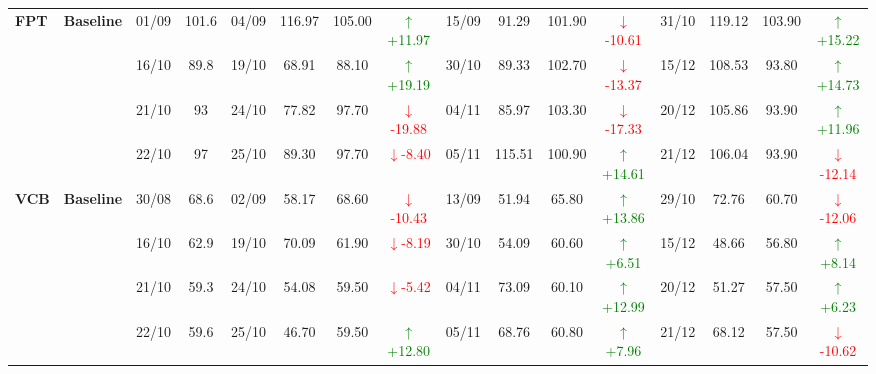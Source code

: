 {\begin{longtable}{llcc|cccc|cccc|cccc}
\multirow{4}{*}{\textbf{FPT}}
& \textbf{Baseline}
& 01/09 & 101.6 & 04/09 & 116.97 & 105.00 & \textcolor{green}{\(\uparrow\)+11.97} & 15/09 & 91.29 & 101.90 & \textcolor{red}{\(\downarrow\)-10.61} & 31/10 & 119.12 & 103.90 & \textcolor{green}{\(\uparrow\)+15.22} \\
& & 16/10 & 89.8 & 19/10 & 68.91 & 88.10 & \textcolor{green}{\(\uparrow\)+19.19} & 30/10 & 89.33 & 102.70 & \textcolor{red}{\(\downarrow\)-13.37} & 15/12 & 108.53 & 93.80 & \textcolor{green}{\(\uparrow\)+14.73} \\
& & 21/10 & 93 & 24/10 & 77.82 & 97.70 & \textcolor{red}{\(\downarrow\)-19.88} & 04/11 & 85.97 & 103.30 & \textcolor{red}{\(\downarrow\)-17.33} & 20/12 & 105.86 & 93.90 & \textcolor{green}{\(\uparrow\)+11.96} \\
& & 22/10 & 97 & 25/10 & 89.30 & 97.70 & \textcolor{red}{\(\downarrow\)-8.40} & 05/11 & 115.51 & 100.90 & \textcolor{green}{\(\uparrow\)+14.61} & 21/12 & 106.04 & 93.90 & \textcolor{red}{\(\downarrow\)-12.14} \\
\midrule

\multirow{4}{*}{\textbf{VCB}}
& \textbf{Baseline}
& 30/08 & 68.6 & 02/09 & 58.17 & 68.60 & \textcolor{red}{\(\downarrow\)-10.43} & 13/09 & 51.94 & 65.80 & \textcolor{green}{\(\uparrow\)+13.86} & 29/10 & 72.76 & 60.70 & \textcolor{red}{\(\downarrow\)-12.06} \\
& & 16/10 & 62.9 & 19/10 & 70.09 & 61.90 & \textcolor{red}{\(\downarrow\)-8.19} & 30/10 & 54.09 & 60.60 & \textcolor{green}{\(\uparrow\)+6.51} & 15/12 & 48.66 & 56.80 & \textcolor{green}{\(\uparrow\)+8.14} \\
& & 21/10 & 59.3 & 24/10 & 54.08 & 59.50 & \textcolor{red}{\(\downarrow\)-5.42} & 04/11 & 73.09 & 60.10 & \textcolor{green}{\(\uparrow\)+12.99} & 20/12 & 51.27 & 57.50 & \textcolor{green}{\(\uparrow\)+6.23} \\
& & 22/10 & 59.6 & 25/10 & 46.70 & 59.50 & \textcolor{green}{\(\uparrow\)+12.80} & 05/11 & 68.76 & 60.80 & \textcolor{green}{\(\uparrow\)+7.96} & 21/12 & 68.12 & 57.50 & \textcolor{red}{\(\downarrow\)-10.62} \\
\midrule


\end{longtable}}
